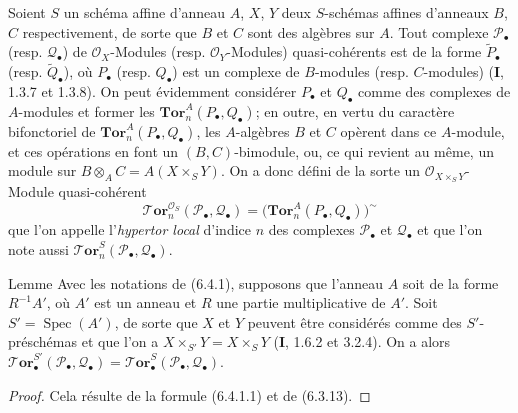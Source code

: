 \begin{env}[6.4.1]
Soient $S$ un schéma affine d'anneau $A$, $X$, $Y$ deux $S$-schémas affines
d'anneaux $B$, $C$ respectivement, de sorte que $B$ et $C$ sont des algèbres
sur $A$. Tout complexe $\mathscr P_\bullet$ (resp. $\mathscr Q_\bullet$) de
$\mathscr O_X$-Modules (resp. $\mathscr O_Y$-Modules) quasi-cohérents est de
la forme $\widetilde{P}_\bullet$ (resp. $\widetilde{Q}_\bullet$), où
$P_\bullet$ (resp. $Q_\bullet$) est un complexe de $B$-modules (resp.
$C$-modules) (\textbf{I}, 1.3.7 et 1.3.8). On peut évidemment considérer $P_\bullet$
et $Q_\bullet$ comme des complexes de $A$-modules et former les
$\mathbf{Tor}_n^A(P_\bullet,Q_\bullet)$; en outre, en vertu du caractère
bifonctoriel de $\mathbf{Tor}_n^A(P_\bullet,Q_\bullet)$, les $A$-algèbres
$B$ et $C$ opèrent dans ce $A$-module, et ces opérations en font un
$(B,C)$-bimodule, ou, ce qui revient au même, un module sur
$B\otimes_A C=A(X\times_S Y)$. On a donc défini de la sorte un
$\mathscr O_{X\times_S Y}$-Module quasi-cohérent
\[
  \boldsymbol{\mathscr{T}\!or}_n^{\mathscr O_S}(\mathscr P_\bullet,\mathscr Q_\bullet)
  =\bigl(\mathbf{Tor}_n^A(P_\bullet,Q_\bullet)\bigr)^{\sim}
  \tag{6.4.1.1}\label{III.6.4.1.1.fr}
\]
que l'on appelle l'\emph{hypertor local} d'indice $n$ des complexes
$\mathscr P_\bullet$ et $\mathscr Q_\bullet$ et que l'on note aussi
$\boldsymbol{\mathscr{T}\!or}_n^S(\mathscr P_\bullet,\mathscr Q_\bullet)$.
\end{env}

\begin{namedtheorem}[6.4.2]{Lemme}
Avec les notations de \textup{(6.4.1)}, supposons que l'anneau $A$ soit de la forme
$R^{-1}A'$, où $A'$ est un anneau et $R$ une partie multiplicative de $A'$.
Soit $S'=\operatorname{Spec}(A')$, de sorte que $X$ et $Y$ peuvent être
considérés comme des $S'$-préschémas et que l'on a
$X\times_{S'}Y=X\times_S Y$ \textup{(\textbf{I}, 1.6.2} et \textup{3.2.4)}. On a alors
$\boldsymbol{\mathscr{T}\!or}_\bullet^{S'}(\mathscr P_\bullet,\mathscr Q_\bullet)
=\boldsymbol{\mathscr{T}\!or}_\bullet^S(\mathscr P_\bullet,\mathscr Q_\bullet)$.
\end{namedtheorem}

\begin{proof}
Cela résulte de la formule (6.4.1.1) et de (6.3.13).
\end{proof}


